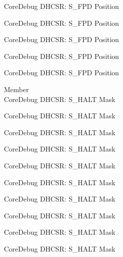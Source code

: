 \begin{DoxyRefList}
\label{deprecated__deprecated000464}%
%
Core\+Debug DHCSR\+: S\+\_\+\+FPD Position 

\label{deprecated__deprecated000566}%
%
Core\+Debug DHCSR\+: S\+\_\+\+FPD Position 

\label{deprecated__deprecated000672}%
%
Core\+Debug DHCSR\+: S\+\_\+\+FPD Position 

\label{deprecated__deprecated001123}%
%
Core\+Debug DHCSR\+: S\+\_\+\+FPD Position 

\label{deprecated__deprecated001225}%
%
Core\+Debug DHCSR\+: S\+\_\+\+FPD Position  
\item[Member \doxylink{group___c_m_s_i_s___core_debug_ga9f881ade3151a73bc5b02b73fe6473ca}{Core\+Debug\+\_\+\+DHCSR\+\_\+\+S\+\_\+\+HALT\+\_\+\+Msk} ]\hfill \\
\label{deprecated__deprecated000026}%
%
Core\+Debug DHCSR\+: S\+\_\+\+HALT Mask 

\label{deprecated__deprecated000118}%
%
Core\+Debug DHCSR\+: S\+\_\+\+HALT Mask 

\label{deprecated__deprecated000172}%
%
Core\+Debug DHCSR\+: S\+\_\+\+HALT Mask 

\label{deprecated__deprecated000257}%
%
Core\+Debug DHCSR\+: S\+\_\+\+HALT Mask 

\label{deprecated__deprecated000314}%
%
Core\+Debug DHCSR\+: S\+\_\+\+HALT Mask 

\label{deprecated__deprecated000390}%
%
Core\+Debug DHCSR\+: S\+\_\+\+HALT Mask 

\label{deprecated__deprecated000477}%
%
Core\+Debug DHCSR\+: S\+\_\+\+HALT Mask 

\label{deprecated__deprecated000579}%
%
Core\+Debug DHCSR\+: S\+\_\+\+HALT Mask 

\label{deprecated__deprecated000685}%
%
Core\+Debug DHCSR\+: S\+\_\+\+HALT Mask 

\label{deprecated__deprecated000777}%
%
Core\+Debug DHCSR\+: S\+\_\+\+HALT Mask 


\end{DoxyRefList}
